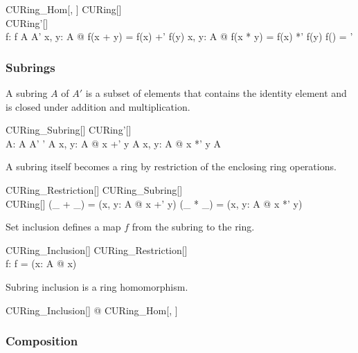 \documentclass{amsart}
\begin{document}
\begin{schema}{CURing\_Hom}[\genT, \genU]
	CURing[\genT] \\
	CURing'[\genU] \\
	f: \genT \pfun \genU
\where
	f \in A \fun A'
\also
	\forall x, y: A @ f(x + y) = f(x) +' f(y)
\also
	\forall x, y: A @ f(x * y) = f(x) *' f(y)
\also
	f(\oneG) = \oneG'
\end{schema}

\subsubsection{Subrings}

A subring $A$ of $A'$ is a subset of elements that contains the identity element and is closed under
addition and multiplication.

\begin{schema}{CURing\_Subring}[\genT]
	CURing'[\genT] \\
	A: \power \genT
\where
	A \subseteq A'
\also
	\oneG' \in A
\also
	\forall x, y: A @ x +' y \in A
\also
	\forall x, y: A @ x *' y \in A	
\end{schema}

A subring itself becomes a ring by restriction of the enclosing ring operations.

\begin{schema}{CURing\_Restriction}[\genT]
	CURing\_Subring[\genT] \\
	CURing[\genT]
\where
	(\_ + \_) = (\lambda x, y: A @ x +' y)
\also
	(\_ * \_) = (\lambda x, y: A @ x *' y)
\end{schema}

Set inclusion defines a map $f$ from the subring to the ring.

\begin{schema}{CURing\_Inclusion}[\genT]
	CURing\_Restriction[\genT] \\
	f: \genT \pfun \genT
\where
	f = (\lambda x: A @ x)
\end{schema}

\begin{remark}
Subring inclusion is a ring homomorphism.

\begin{zed}
\forall CURing\_Inclusion[\setT] @ CURing\_Hom[\setT, \setT]
\end{zed}

\end{remark}

\subsubsection{Composition}
\end{document}
